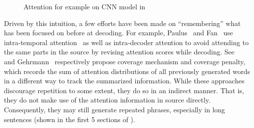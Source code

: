 \begin{figure}[th!]
\centering
{}
\quad
{}
\quad
{}
\caption{Attention for example on CNN model in }
\label{fig:attn_map}
\end{figure}

Driven by this intuition, a few efforts have been made on ``remembering''
what has been focused on before at decoding. 
For example, 
Paulus~\cite{PaulusXS17} and 
Fan~\cite{FanGA18} use intra-temporal 
attention~\cite{NallapatiZSGX16} as well as intra-decoder attention to avoid
attending to the same parts in the source by 
revising attention scores while decoding. 
See~\cite{SeeLM17} and Gehrmann~\cite{GehrmannDR18}
respectively propose coverage mechanism and coverage penalty,
which records the sum of attention distributions of all previously generated words 
in a different way to track the summarized information.  
While these approaches discourage repetition to some extent,
they do so in an indirect manner. That is, they do not 
make use of the attention information in source directly.
Consequently, they may still generate repeated phrases, 
especially in long sentences (shown in the first 5 sections of
).



